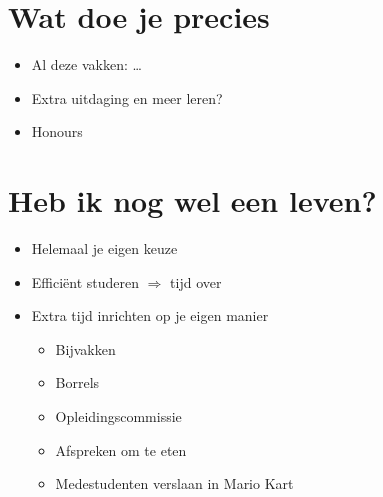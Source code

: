 \documentclass{article}
\begin{document}
\section*{Wat doe je precies}
\begin{itemize}
    \item Al deze vakken: \dots
    \item Extra uitdaging en meer leren?
    \item Honours
\end{itemize}

\section*{Heb ik nog wel een leven?}
\begin{itemize}
    \item Helemaal je eigen keuze
    \item Efficiënt studeren \(\Rightarrow\) tijd over
    \item Extra tijd inrichten op je eigen manier
          \begin{itemize}
              \item Bijvakken
              \item Borrels
              \item Opleidingscommissie
              \item Afspreken om te eten
              \item Medestudenten verslaan in Mario Kart
          \end{itemize}
\end{itemize}
\end{document}
